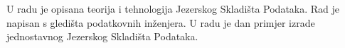 \begin{sazetak}

U radu je opisana teorija i tehnologija Jezerskog Skladišta Podataka. Rad je
napisan s gledišta podatkovnih inženjera. U radu je dan primjer
izrade jednostavnog Jezerskog Skladišta Podataka.

\end{sazetak}